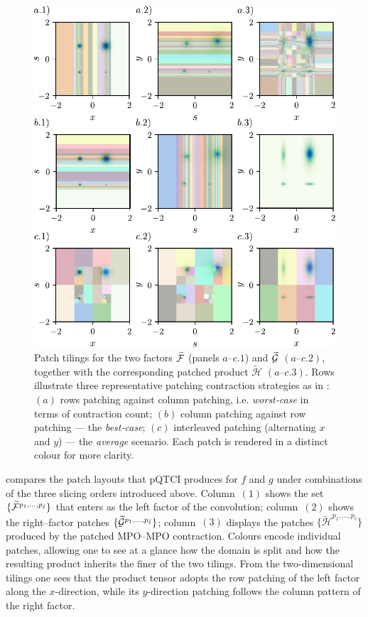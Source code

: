 \begin{figure}[htbp]
    \centering
    \includegraphics{figures/PatchContrResults.pdf}
    \caption{Patch tilings for the two factors \(\widetilde{\mathcal{F}}\) (panels
    $a–c.1$) and \(\widetilde{\mathcal{G}}\) $(a–c.2)$, together with the corresponding
    patched product \(\widetilde{\mathcal H}\) $(a–c.3)$. Rows illustrate three representative patching contraction strategies as in : $(a)$ rows patching against column patching, i.e. \emph{worst‐case} in terms of contraction count;
    $(b)$ column patching against row patching — the \emph{best‐case};
   $(c)$ interleaved patching (alternating \(x\) and \(y\)) — the
    \emph{average} scenario. Each patch is rendered in a distinct colour for more clarity.}
    \label{fig:patchingPatternsMatMul}
\end{figure}

 compares the patch layouts that pQTCI produces for \(f\) and \(g\) under combinations of the three slicing orders introduced above.  
Column~$(1)$ shows the set \(\{\widetilde{\mathcal{F}}^{p_{1},\dots,p_{\bar\ell}}\}\) that enters as the left factor of the convolution; column~$(2)$ shows the right–factor patches
\(\{\widetilde{\mathcal{G}}^{p_{1},\dots,p_{\bar\ell}}\}\); column~$(3)$ displays the patches \(\{\widetilde{\mathcal H}^{p_{1},\dots,p_{\bar\ell}}\}\) produced by the patched MPO–MPO contraction. Colours encode individual patches, allowing one to see at a glance how the
domain is split and how the resulting product inherits the finer of the two tilings. From the two-dimensional tilings one sees that the product tensor adopts the row patching of the left factor along the $x$-direction, while its $y$-direction patching follows the column pattern of the right factor.

